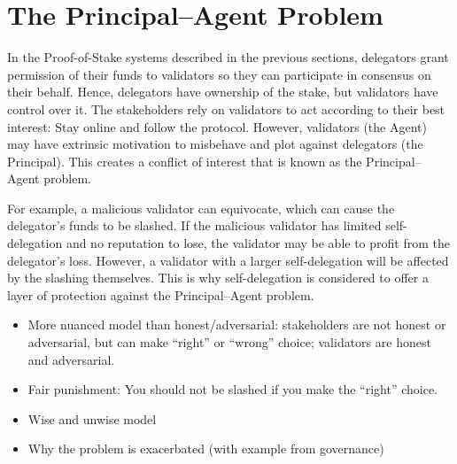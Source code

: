 \section{The Principal--Agent Problem}
In the Proof-of-Stake systems described in the previous sections,
delegators grant permission of their funds to validators so they can
participate in consensus on their behalf.
Hence, delegators have ownership of the stake, but
validators have control over it.
The stakeholders rely on validators to act according to their
best interest: Stay online and follow the protocol.
However, validators (the Agent) may have extrinsic motivation to
misbehave and plot against delegators (the Principal). This creates
a conflict of interest that is known as the Principal--Agent problem.

For example, a malicious validator can equivocate, which can cause
the delegator's funds to be slashed. If the malicious validator has
limited self-delegation and no reputation to lose, the validator
may be able to profit from the delegator's loss. However, a validator
with a larger self-delegation will be affected by the slashing themselves.
This is why self-delegation is considered to offer a layer of protection
against the Principal--Agent problem.

\begin{itemize}
    \item More nuanced model than honest/adversarial: stakeholders are not honest or adversarial, but can make ``right'' or ``wrong'' choice; validators are honest and adversarial.
    \item Fair punishment: You should not be slashed if you make the ``right'' choice.
    \item Wise and unwise model
    \item Why the problem is exacerbated (with example from governance)
\end{itemize}

